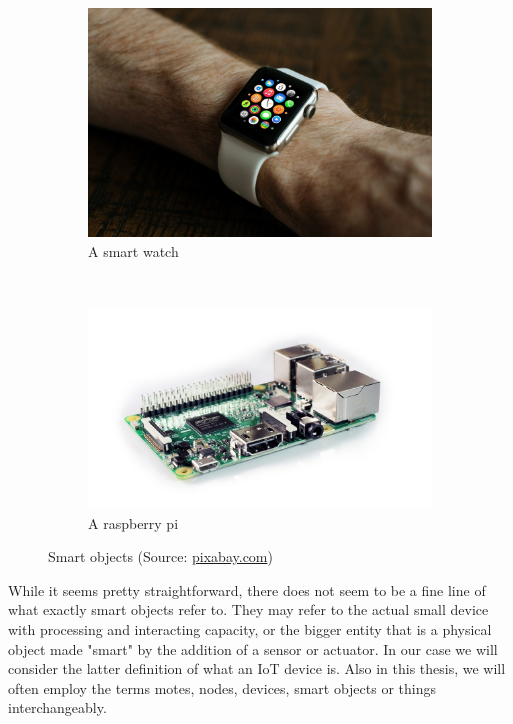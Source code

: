 \begin{figure}
    \centering
    \begin{subfigure}[b]{0.3\textwidth}
        \includegraphics[width=\textwidth]{res/smart_watch}
        \caption{A smart watch}
        \label{fig:smart_watch}
    \end{subfigure}
    ~
    \begin{subfigure}[b]{0.3\textwidth}
        \includegraphics[width=\textwidth]{res/raspberry_pi}
        \caption{A raspberry pi}
        \label{fig:raspberry}
    \end{subfigure}
    \caption{Smart objects (Source: \url{pixabay.com})}\label{fig:smart_objects}
\end{figure}

While it seems pretty straightforward, there does not seem to be a fine line of what exactly smart objects refer to. They may refer to the actual small device with processing and interacting capacity, or the bigger entity that is a physical object made "smart" by the addition of a sensor or actuator. In our case we will consider the latter definition of what an IoT device is. Also in this thesis, we will often employ the terms motes, nodes, devices, smart objects or things interchangeably. \\

